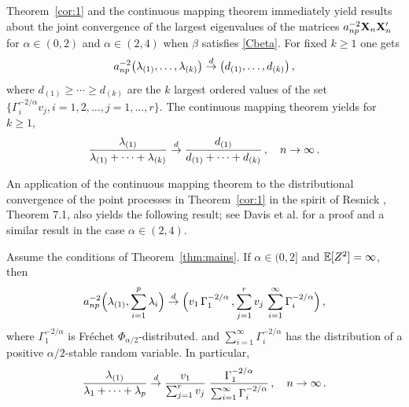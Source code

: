 \par
Theorem~\ref{cor:1} and the continuous mapping theorem immediately yield results about
the joint convergence of the largest eigenvalues of the matrices $a_{np}^{-2}{\mathbf X}_n{\mathbf X}_n'$ for $\alpha\in (0,2)$ and
$\alpha\in (2,4)$ when $\beta$ satisfies \ref{Cbeta}.
For fixed $k\ge 1$ one gets
\begin{equation*}
a_{np}^{-2} \big(\lambda_{(1)},\ldots,\lambda_{(k)}\big)\stackrel{d}{\rightarrow}
\big(d_{(1)},\ldots, d_{(k)}\big)\,,
\end{equation*}
where $d_{(1)}\ge \cdots\ge d_{(k)}$ are the $k$ largest ordered
values of the set $\{\Gamma_i^{-2/\alpha} v_j, i=1,2,\ldots,j=1,\ldots,r\}$.
The continuous mapping theorem yields for $k\ge 1$,
\begin{equation}\label{eq:u}
\dfrac{\lambda_{(1)}}{\lambda_{(1)}+\cdots+ \lambda_{(k)}}\stackrel{d}{\rightarrow}
\dfrac{d_{(1)}}{d_{(1)}+\cdots+ d_{(k)}}\,,\quad n \to \infty\,.
\end{equation}

An application of the continuous mapping theorem to  the distributional convergence of the point processes in Theorem~\ref{cor:1} in the spirit of Resnick
\cite{resnick:2007}, Theorem 7.1, also yields the following result; see Davis et al. \cite{davis:mikosch:pfaffel:2015} for a proof and a similar result in the case $\alpha \in (2,4)$.
\begin{corollary}\label{cor:1q} Assume the conditions of Theorem~\ref{thm:mains}.
If $\alpha \in (0,2]$ and $\mathbb{E}[Z^2]=\infty$, then
\begin{equation*}
a_{np}^{-2}\Big(\lambda_{(1)},\sum_{i=1}^p \lambda_i\Big) \stackrel{d}{\rightarrow}
\Big( v_1\,\Gamma_1^{-2/\alpha}\,,\sum_{j=1}^r v_j\,\sum_{i=1}^\infty \Gamma_i^{-2/\alpha}\Big)\,,
\end{equation*}
where $\Gamma_1^{-2/\alpha}$ is Fr\'echet $\Phi_{\alpha/2}$-distributed.
and $\sum_{i=1}^\infty \Gamma_i^{-2/\alpha}$ has the distribution
of a positive $\alpha/2$-stable random variable.
In particular,
\begin{equation}\label{eq:limit}
\dfrac{\lambda_{(1)}}{\lambda_{1}+\cdots+ \lambda_{p}}\stackrel{d}{\rightarrow}
\dfrac{v_1}{\sum_{j=1}^r v_j}\;
\dfrac{\Gamma_1^{-2/\alpha}}{\sum_{i=1}^\infty\Gamma_i^{-2/\alpha}}\,,\quad
n \to \infty\,.
\end{equation}
\end{corollary}

